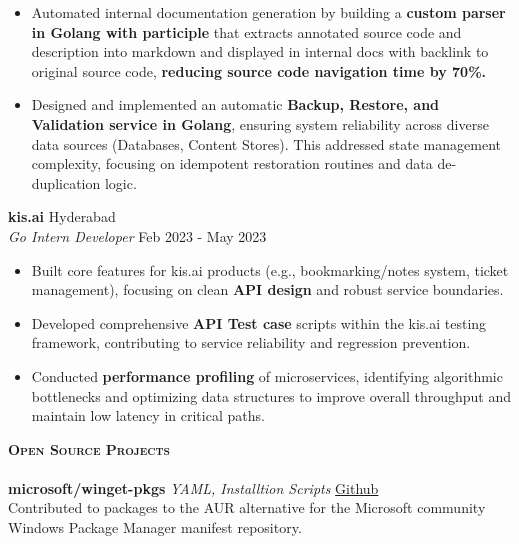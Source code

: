 \documentclass[a4paper]{article}
\newcommand{\lineunder} {
    \vspace*{-8pt} \\
    \hspace*{-18pt} \hrulefill \\
}
\newcommand{\header} [1] {
    {\hspace*{-18pt}\vspace*{6pt} \textbf{\textsc{#1}}}
    \vspace*{-6pt} \lineunder
}
\begin{document}
\begin{itemize}
	\item Automated internal documentation generation by building a \textbf{custom parser in Golang with participle} that extracts annotated source code and description into markdown and displayed in internal docs with backlink to original source code, \textbf{reducing source code navigation time by 70\%.}
    \item Designed and implemented an automatic \textbf{Backup, Restore, and Validation service in Golang}, ensuring system reliability across diverse data sources (Databases, Content Stores). This addressed state management complexity, focusing on idempotent restoration routines and data de-duplication logic.
\end{itemize}
\textbf{kis.ai} \hfill Hyderabad\\
\textit{Go Intern Developer} \hfill Feb 2023 - May 2023\\
\vspace{-1mm}
\begin{itemize} \itemsep 1pt
	\item Built core features for kis.ai products (e.g., bookmarking/notes system, ticket management), focusing on clean \textbf{API design} and robust service boundaries.
    \item Developed comprehensive \textbf{API Test case} scripts within the kis.ai testing framework, contributing to service reliability and regression prevention.
    \item Conducted \textbf{performance profiling} of microservices, identifying algorithmic bottlenecks and optimizing data structures to improve overall throughput and maintain low latency in critical paths.
\end{itemize}
\vspace{1mm}


\begin{minipage}{\linewidth}
\header{Open Source Projects}
{\textbf{microsoft/winget-pkgs}} {\sl YAML, Installtion Scripts} \hfill \href{https://github.com/microsoft/winget-pkgs/pulls?q=is%3Apr+is%3Amerged+author%3Apr1sm8}{Github \faExternalLink}\\
Contributed to packages to the AUR alternative for the Microsoft community Windows Package Manager manifest repository.\\
\vspace{2mm}
\end{minipage}
\end{document}
